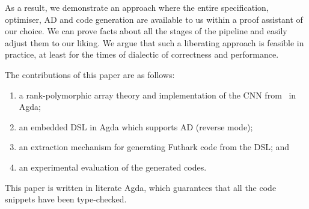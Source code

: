 As a result, we demonstrate an approach where the entire specification,
optimiser, AD and code generation are available to us within a proof
assistant of our choice.  We can prove facts about all the
stages of the pipeline and easily adjust them to our liking.
We argue that such a liberating
approach is feasible in practice, at least for the times of dialectic
of correctness and performance.


The contributions of this paper are as follows:
\begin{enumerate}
  \item a rank-polymorphic array theory and implementation of
        the CNN from~\cite{cnn-array} in Agda;
  \item an embedded DSL in Agda which supports AD (reverse mode);
  \item an extraction mechanism for generating Futhark code from the DSL; and
  \item an experimental evaluation of the generated codes.
\end{enumerate}

This paper is written in literate Agda, which guarantees that all the code
snippets have been type-checked.


